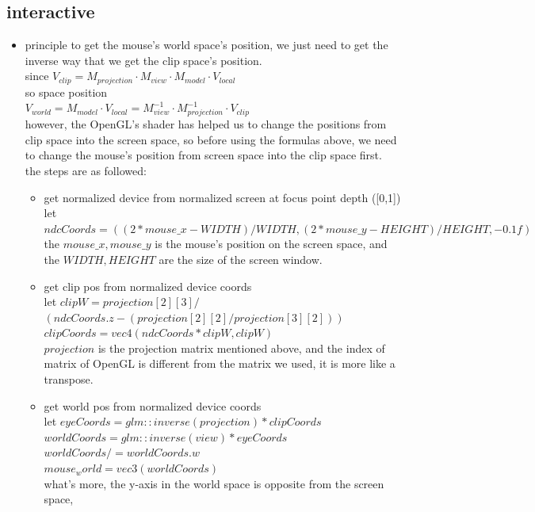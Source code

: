 \documentclass[acmtog]{acmart}
\begin{document}
\subsection{interactive}
\begin{itemize}
	\item principle 
	to get the mouse's world space's position, we just need to get the inverse way that we get the clip space's position.\\
	since $V_{clip}=M_{projection}\cdot M_{view}\cdot M_{model}\cdot V_{local}$\\
	so space position \\$V_{world}=M_{model}\cdot V_{local}= M_{view}^{-1}\cdot M_{projection}^{-1}\cdot V_{clip}$\\
	however, the OpenGL's shader has helped us to change the positions from clip space into the screen space, 
	so before using the formulas above, we need to change the mouse's position from screen space into the clip space first.\\
	the steps are as followed:
	\begin{itemize}
		\item get normalized device from normalized screen at focus point depth ([0,1])\\
		let $ ndcCoords = ((2 * mouse\_x - WIDTH) / WIDTH, (2 * mouse\_y - HEIGHT) / HEIGHT, -0.1f)$\\
		the $mouse\_x,mouse\_y$ is the mouse's position on the screen space,
		and the $WIDTH,HEIGHT$ are the size of the screen window.
		\item get clip pos from normalized device coords\\
		let $clipW = projection[2][3] / $\\$(ndcCoords.z - (projection[2][2] / projection[3][2]))$\\
		$ clipCoords = vec4(ndcCoords * clipW, clipW)$\\
		$projection$ is the projection matrix mentioned above, and the index of matrix of OpenGL is different from the matrix we used, it is more like a transpose.
		\item get world pos from normalized device coords\\
		let $eyeCoords = glm::inverse(projection) * clipCoords$\\
		$worldCoords = glm::inverse(view) * eyeCoords$\\
		$worldCoords /= worldCoords.w$\\
		$mouse_world = vec3(worldCoords)$\\
		what's more, the y-axis in the world space is opposite from the screen space,\\

\end{itemize}
\end{itemize}
\end{document}
